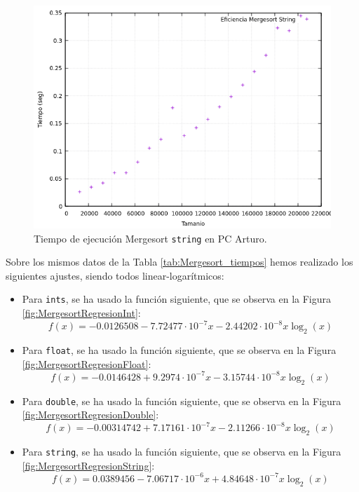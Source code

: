 \documentclass[12pt]{article}
\begin{document}
    \begin{figure}
        \centering
        \includegraphics[width=0.8\linewidth]{images/Mergesort/Mergesort_Str_Graf.png}
        \cprotect\caption{Tiempo de ejecución Mergesort \verb|string| en PC Arturo.}
        \label{fig:Mergesort_string_graf}
    \end{figure}

    Sobre los mismos datos de la Tabla \ref{tab:Mergesort_tiempos} hemos realizado los siguientes ajustes, siendo todos linear-logarítmicos:

    \begin{itemize}
        \item Para \verb|ints|, se ha usado la función siguiente, que se observa en la Figura \ref{fig:MergesortRegresionInt}:
    $$f(x)=-0.0126508-7.72477\cdot 10^{-7}x-2.44202\cdot 10^{-8}x\log_2(x)$$

    \item Para \verb|float|, se ha usado la función siguiente, que se observa en la Figura \ref{fig:MergesortRegresionFloat}:
    $$f(x)=-0.0146428+9.2974\cdot 10^{-7}x-3.15744\cdot 10^{-8}x\log_2(x)$$

    \item Para \verb|double|, se ha usado la función siguiente, que se observa en la Figura \ref{fig:MergesortRegresionDouble}:
    $$f(x)=-0.00314742+7.17161\cdot 10^{-7}x-2.11266\cdot 10^{-8}x\log_2(x)$$

    \item Para \verb|string|, se ha usado la función siguiente, que se observa en la Figura \ref{fig:MergesortRegresionString}:
    $$f(x)=0.0389456-7.06717\cdot 10^{-6}x+4.84648\cdot 10^{-7}x\log_2(x)$$
    \end{itemize}
\end{document}
